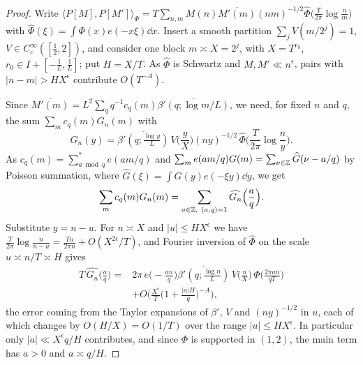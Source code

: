 \documentclass[11pt,colorlinks]{charlie}
\newcommand{\ip}[2]{\langle #1,#2\rangle}
\begin{document}
\begin{proof}
Write $\ip{P[M]}{P[M']}_\Phi=T\sum_{n,m}M(n)\overline{M'(m)}(nm)^{-1/2}\widehat\Phi\big(\frac T{2\pi}\log\frac nm\big)$ with $\widehat\Phi(\xi)=\int\Phi(x)e(-x\xi)\dd x$. Insert a smooth partition $\sum_jV(m/2^j)=1$, $V\in C_c^\infty([\frac12,2])$, and consider one block $m\asymp X=2^j$, with $X=T^{r_0}$, $r_0\in I+[-\frac1L,\frac1L]$; put $H=X/T$. As $\widehat\Phi$ is Schwartz and $M,M'\ll n^\epsilon$, pairs with $|n-m|>HX^{\epsilon}$ contribute $O(T^{-A})$.

Since $\overline{M'(m)}=L^2\sum_qq^{-1}c_q(m)\overline{\beta'(q;\log m/L)}$, we need, for fixed $n$ and $q$, the sum $\sum_mc_q(m)G_n(m)$ with
\[
 G_n(y)=\overline{\beta'(q;\tfrac{\log y}L)}\,V\Big(\frac yX\Big)(ny)^{-1/2}\,\widehat\Phi\Big(\frac T{2\pi}\log\frac ny\Big).
\]
As $c_q(m)=\sum_{a\bmod q}^*e(am/q)$ and $\sum_me(am/q)G(m)=\sum_{\nu\in\mathbb{Z}}\widehat G(\nu-a/q)$ by Poisson summation, where $\widehat G(\xi)=\int G(y)e(-\xi y)\dd y$, we get
\[
 \sum_mc_q(m)G_n(m)=\sum_{a\in\Z,\ (a,q)=1}\widehat{G_n}\Big(\frac aq\Big).
\]
Substitute $y=n-u$. For $n\asymp X$ and $|u|\le HX^\epsilon$ we have $\frac T{2\pi}\log\frac n{n-u}=\frac{Tu}{2\pi n}+O(X^{2\epsilon}/T)$, and Fourier inversion of $\widehat\Phi$ on the scale $u\asymp n/T\asymp H$ gives
\begin{equation}\label{eq:packet}
 \begin{split}
 T\,\widehat{G_n}\Big(\frac aq\Big)={}&2\pi\,e\Big(-\frac{an}q\Big)\overline{\beta'(q;\tfrac{\log n}L)}\,V\Big(\frac nX\Big)\,\Phi\Big(\frac{2\pi an}{qT}\Big)\\
 &+O\Big(\frac{X^\epsilon}T\Big(1+\frac{|a|H}q\Big)^{-A}\Big),
 \end{split}
\end{equation}
the error coming from the Taylor expansions of $\beta'$, $V$ and $(ny)^{-1/2}$ in $u$, each of which changes by $O(H/X)=O(1/T)$ over the range $|u|\le HX^\epsilon$. In particular only $|a|\ll X^\epsilon q/H$ contributes, and since $\Phi$ is supported in $(1,2)$, the main term has $a>0$ and $a\asymp q/H$.


\end{proof}
\end{document}
